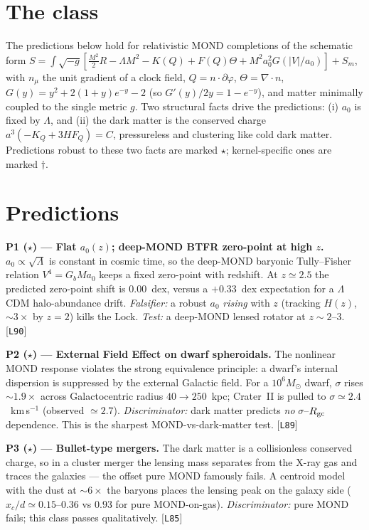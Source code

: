 \documentclass[11pt,letterpaper]{article}
\begin{document}
\section{The class}
The predictions below hold for relativistic MOND completions of the schematic form
$S=\int\sqrt{-g}[\tfrac{M^2}{2}R-\Lambda M^2-K(Q)+F(Q)\Theta+M^2a_0^2G(|V|/a_0)]+S_m$, with $n_\mu$ the unit
gradient of a clock field, $Q=n\!\cdot\!\partial\varphi$, $\Theta=\nabla\!\cdot\!n$, $G(y)=y^2+2(1+y)e^{-y}-2$
(so $G'(y)/2y=1-e^{-y}$), and matter minimally coupled to the single metric $g$. Two structural facts drive
the predictions: (i) $a_0$ is fixed by $\Lambda$, and (ii) the dark matter is the conserved charge
$a^3(-K_Q+3HF_Q)=C$, pressureless and clustering like cold dark matter. Predictions robust to these two facts
are marked $\star$; kernel-specific ones are marked $\dagger$.

\section{Predictions}

\textbf{P1 ($\star$) --- Flat $a_0(z)$; deep-MOND BTFR zero-point at high $z$.}
$a_0\propto\sqrt{\Lambda}$ is constant in cosmic time, so the deep-MOND baryonic Tully--Fisher relation
$V^4=G_bMa_0$ keeps a fixed zero-point with redshift. At $z\simeq2.5$ the predicted zero-point shift is
$0.00$~dex, versus a $+0.33$~dex expectation for a $\Lambda$CDM halo-abundance drift.
\emph{Falsifier:} a robust $a_0$ \emph{rising} with $z$ (tracking $H(z)$, $\sim\!3\times$ by $z=2$) kills the
Lock. \emph{Test:} a deep-MOND lensed rotator at $z\!\sim\!2$--$3$. [\texttt{L90}]

\textbf{P2 ($\star$) --- External Field Effect on dwarf spheroidals.}
The nonlinear MOND response violates the strong equivalence principle: a dwarf's internal dispersion is
suppressed by the external Galactic field. For a $10^6M_\odot$ dwarf, $\sigma$ rises $\sim\!1.9\times$ across
Galactocentric radius $40\to250$~kpc; Crater~II is pulled to $\sigma\simeq2.4$~km\,s$^{-1}$ (observed
$\simeq2.7$). \emph{Discriminator:} dark matter predicts \emph{no} $\sigma$--$R_{\rm gc}$ dependence. This is
the sharpest MOND-vs-dark-matter test. [\texttt{L89}]

\textbf{P3 ($\star$) --- Bullet-type mergers.}
The dark matter is a collisionless conserved charge, so in a cluster merger the lensing mass separates from
the X-ray gas and traces the galaxies --- the offset pure MOND famously fails. A centroid model with the
dust at $\sim\!6\times$ the baryons places the lensing peak on the galaxy side ($x_c/d\simeq0.15$--$0.36$ vs
$0.93$ for pure MOND-on-gas). \emph{Discriminator:} pure MOND fails; this class passes qualitatively.
[\texttt{L85}]
\end{document}
